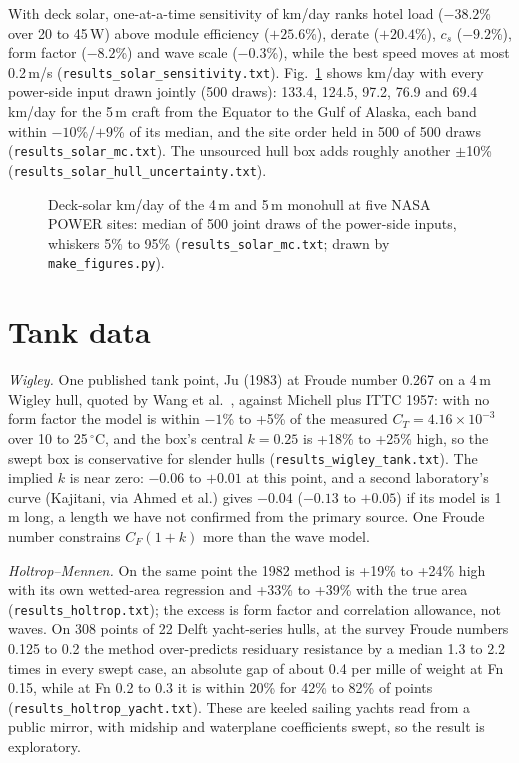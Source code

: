 \documentclass[conference]{IEEEtran}
\begin{document}
With deck solar, one-at-a-time sensitivity of km/day ranks hotel load ($-38.2$\% over 20 to
45\,W) above module efficiency ($+25.6$\%), derate ($+20.4$\%), $c_s$ ($-9.2$\%), form factor
($-8.2$\%) and wave scale ($-0.3$\%), while the best speed moves at most 0.2\,m/s
(\texttt{results\_solar\_sensitivity.txt}). Fig.~\ref{fig:solar} shows km/day with every power-side
input drawn jointly (500 draws): 133.4, 124.5, 97.2, 76.9 and 69.4\,km/day for the 5\,m craft from
the Equator to the Gulf of Alaska, each band within $-10$\%/$+9$\% of its median, and the site
order held in 500 of 500 draws (\texttt{results\_solar\_mc.txt}). The unsourced hull box adds
roughly another $\pm$10\% (\texttt{results\_solar\_hull\_uncertainty.txt}).

\begin{figure}[t]
\centering

\caption{Deck-solar km/day of the 4\,m and 5\,m monohull at five NASA POWER sites: median of 500
joint draws of the power-side inputs, whiskers 5\% to 95\% (\texttt{results\_solar\_mc.txt};
drawn by \texttt{make\_figures.py}).}
\label{fig:solar}
\end{figure}

\section{Tank data}\label{sec:tank}
\emph{Wigley.} One published tank point, Ju (1983) \cite{ju1983} at Froude number 0.267 on a 4\,m Wigley hull,
quoted by Wang et al.\ \cite{wang2017}, against Michell plus ITTC 1957: with no form factor the
model is within $-1$\% to +5\% of the measured $C_T = 4.16\times10^{-3}$ over 10 to 25\,$^\circ$C,
and the box's central $k=0.25$ is +18\% to +25\% high, so the swept box is conservative for
slender hulls (\texttt{results\_wigley\_tank.txt}). The implied $k$ is near zero: $-0.06$ to
$+0.01$ at this point, and a second laboratory's curve (Kajitani, via Ahmed et al.) gives $-0.04$ ($-0.13$ to $+0.05$) if its model is 1\,m long, a length we have not confirmed from the primary source.
One Froude number constrains $C_F(1+k)$ more than the wave model.

\emph{Holtrop--Mennen.} On the same point the 1982 method \cite{holtrop1982} is +19\% to +24\% high
with its own wetted-area regression and +33\% to +39\% with the true area
(\texttt{results\_holtrop.txt}); the excess is form factor and correlation allowance, not waves.
On 308 points of 22 Delft yacht-series hulls, at the survey Froude numbers 0.125 to 0.2 the method
over-predicts residuary resistance by a median 1.3 to 2.2 times in every swept case, an absolute gap
of about 0.4 per mille of weight at Fn 0.15, while at Fn 0.2 to 0.3 it is within 20\% for 42\% to
82\% of points (\texttt{results\_holtrop\_yacht.txt}). These are keeled sailing yachts read from a public mirror,
with midship and waterplane coefficients swept, so the result is exploratory.
\end{document}
